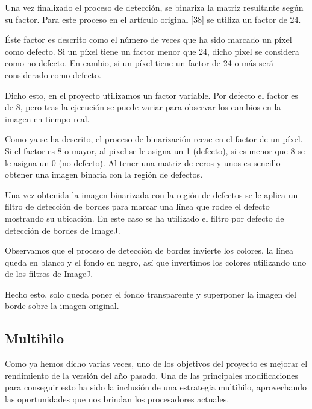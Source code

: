 Una vez finalizado el proceso de detección, se binariza la matriz resultante según su factor. Para este proceso en el artículo original [38] se utiliza un factor de 24.

Éste factor es descrito como el número de veces que ha sido marcado un píxel como defecto. Si un píxel tiene un factor menor que 24, dicho pixel se considera como no defecto. En cambio, si un píxel tiene un factor de 24 o más será considerado como defecto.

Dicho esto, en el proyecto utilizamos un factor variable. Por defecto el factor es de 8, pero tras la ejecución se puede variar para observar los cambios en la imagen en tiempo real.

Como ya se ha descrito, el proceso de binarización recae en el factor de un píxel. Si el factor es 8 o mayor, al pixel se le asigna un 1 (defecto), si es menor que 8 se le asigna un 0 (no defecto). Al tener una matriz de ceros y unos es sencillo obtener una imagen binaria con la región de defectos.


Una vez obtenida la imagen binarizada con la región de defectos se le aplica un filtro de detección de bordes para marcar una línea que rodee el defecto mostrando su ubicación. En este caso se ha utilizado el filtro por defecto de detección de bordes de ImageJ.

Observamos que el proceso de detección de bordes invierte los colores, la línea queda en blanco y el fondo en negro, así que invertimos los colores utilizando uno de los filtros de ImageJ.

Hecho esto, solo queda poner el fondo transparente y superponer la imagen del borde sobre la imagen original.

\subsection{Multihilo}
Como ya hemos dicho varias veces, uno de los objetivos del proyecto es mejorar el rendimiento de la versión del año pasado. Una de las principales modificaciones para conseguir esto ha sido la inclusión de una estrategia multihilo, aprovechando las oportunidades que nos brindan los procesadores actuales.

